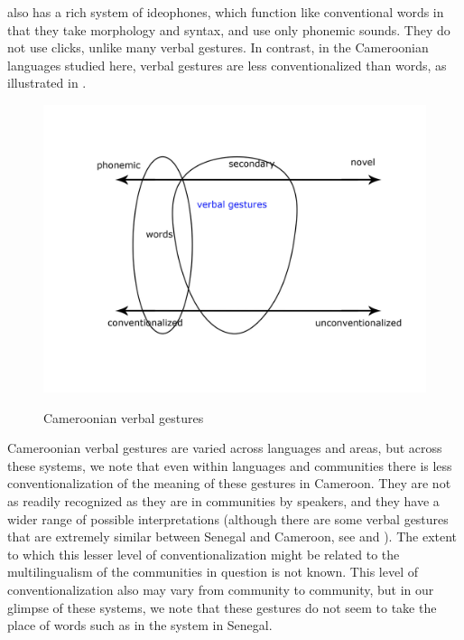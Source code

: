 \documentclass[output=paper,newtxmath,modfonts,nonflat,hidelinks]{langsci/langscibook}
\begin{document}
 also has a rich system of ideophones, which function like conventional words in that they take morphology and syntax, and use only phonemic sounds.  They do not use  clicks, unlike many  verbal gestures. In contrast, in the Cameroonian languages studied here, verbal gestures are less conventionalized than words, as illustrated in .


\begin{figure} 
\includegraphics[scale=0.15]{figures/cameroonsystem.jpg}\\
\caption{Cameroonian verbal gestures}
\label{fig:pillion:cam}
\end{figure}

Cameroonian verbal gestures are varied across languages and areas, but across these systems, we note that even within languages and communities there is less conventionalization of the meaning of these gestures in Cameroon. They are not as readily recognized as they are in  communities by speakers, and they have a wider range of possible interpretations (although there are some verbal gestures that are extremely similar between Senegal and Cameroon, see  and ). The extent to which this lesser level of conventionalization might be related to the multilingualism of the communities in question is not known. This level of conventionalization also may vary from community to community, but in our glimpse of these systems, we note that these gestures do not seem to take the place of words such as in the system in Senegal. 
\end{document}
